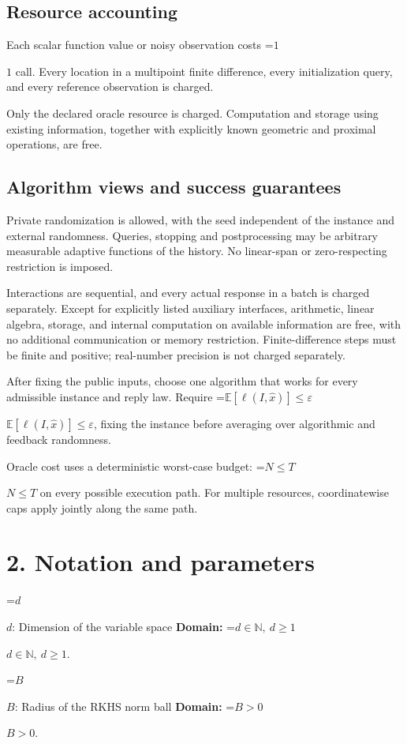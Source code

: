 \documentclass[10pt,a4paper]{article}
\newcommand{\AtlasMath}[1]{\par\begingroup\centering\setbox0=\hbox{$\displaystyle #1$}\ifdim\wd0>1.4\linewidth\typeout{ATLAS WIDE FORMULA: \the\wd0}\fi\ifdim\wd0>\linewidth\resizebox{\linewidth}{!}{\box0}\else\box0\fi\par\endgroup}
\newcommand{\AtlasInlineMath}[1]{\begingroup\setbox0=\hbox{$#1$}\ifdim\wd0>.4\linewidth\endgroup\AtlasMath{#1}\else\endgroup$#1$\fi}
\begin{document}
\subsection{Resource accounting}
Each scalar function value or noisy observation costs \AtlasInlineMath{1} call. Every location in a multipoint finite difference, every initialization query, and every reference observation is charged.

Only the declared oracle resource is charged. Computation and storage using existing information, together with explicitly known geometric and proximal operations, are free.

\subsection{Algorithm views and success guarantees}
Private randomization is allowed, with the seed independent of the instance and external randomness. Queries, stopping and postprocessing may be arbitrary measurable adaptive functions of the history. No linear-span or zero-respecting restriction is imposed.

Interactions are sequential, and every actual response in a batch is charged separately. Except for explicitly listed auxiliary interfaces, arithmetic, linear algebra, storage, and internal computation on available information are free, with no additional communication or memory restriction. Finite-difference steps must be finite and positive; real-number precision is not charged separately.

After fixing the public inputs, choose one algorithm that works for every admissible instance and reply law. Require \AtlasInlineMath{\mathbb{E}[\ell(I,\widehat{x})]\le \varepsilon}, fixing the instance before averaging over algorithmic and feedback randomness.

Oracle cost uses a deterministic worst-case budget: \AtlasInlineMath{N\le T} on every possible execution path. For multiple resources, coordinatewise caps apply jointly along the same path.

\section{2. Notation and parameters}
\AtlasInlineMath{d}: Dimension of the variable space \textbf{Domain:} \AtlasInlineMath{d\in\mathbb{N},\ d\ge1}.

\AtlasInlineMath{B}: Radius of the RKHS norm ball \textbf{Domain:} \AtlasInlineMath{B>0}.
\end{document}
